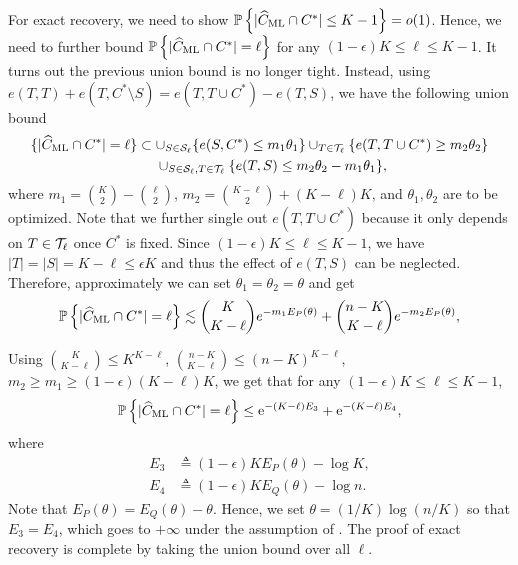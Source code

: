 For exact recovery, we need to show $ \mathbb{P}\left\{  | \widehat{C}_{\rm ML}  \cap C^* | \le K-1 \right\}  =o(1)$.
Hence, we need to further bound $\mathbb{P}\left\{  | \widehat{C}_{\rm ML}  \cap C^* | =\ell \right\} $ for any $(1-\epsilon)K \le \ell \le K-1$. 
It turns out the previous union bound  is no longer tight. Instead, using
$ e(T, T) + e(T, C^*\setminus S) = e(T, T\cup C^*) - e(T, S)$, we have the following union bound
\begin{align*}
 \{   | \widehat{C}_{\rm ML}  \cap C^* | = \ell \}   
 & \subset \cup_{S \in {\mathcal{S}}_\ell} \{ e(S, C^*)  \leq m_1 \theta_1  \}  \cup_{T \in {\mathcal{T}}_\ell} \{ e(T, T\cup C^*) \ge m_2\theta_2 \}  \\
 & ~~~~ \cup_{S \in {\mathcal{S}}_\ell, T \in {\mathcal{T}}_\ell} \{ e(T, S) \le m_2 \theta_2 - m_1 \theta_1 \},
\end{align*}
where $m_1 = \binom{K}{2} - \binom{\ell}{2}$, $m_2= \binom{K-\ell}{2} + (K-\ell) K$, and $\theta_1,\theta_2$ are to be optimized.
Note that we further single out $e(T, T\cup C^*)$ because it only depends on $T \in {\mathcal{T}}_\ell$ once $C^*$ is fixed. 
Since $(1-\epsilon)K \le \ell \le K-1$, we have $|T| = |S| = K-\ell \le \epsilon K$ and thus the effect of $e(T, S)$ can be neglected.
 Therefore, approximately we can set $\theta_1=\theta_2=\theta$ and get
\begin{align}
\mathbb{P}\left\{  | \widehat{C}_{\rm ML}  \cap C^* | =\ell \right\} \lesssim  \binom{K}{K-\ell} e^{- m_1 E_P(\theta)}  + 
 \binom{n-K}{K-\ell} e^{- m_2 E_P(\theta) },
\end{align}

Using $\binom{K}{K-\ell} \le K^{K-\ell}$, $\binom{n-K}{K-\ell} \le (n-K)^{K-\ell}$, $m_2 \ge m_1 \ge (1-\epsilon) (K-\ell) K$, 
we get that for any $(1-\epsilon)K \le \ell \le K-1$,
\begin{align}
\mathbb{P}\left\{  | \widehat{C}_{\rm ML}  \cap C^* |=\ell \right\}  \le {\rm e}^{-(K-\ell) E_3} + {\rm e}^{-(K-\ell) E_4}, \label{eq:weakProbupperbound1}
\end{align}
where
\begin{align*}
E_3 &\triangleq (1-\epsilon) K E_P(\theta)  - \log K , \\
E_4 &\triangleq (1-\epsilon) K E_Q(\theta) - \log n. 
\end{align*}
Note that $E_P(\theta)= E_Q(\theta) - \theta$.  Hence, we set
$\theta= (1/K) \log (n/K)$ so that $E_3=E_4$, which goes to $+\infty$ under the assumption of .
The proof of exact recovery is complete by taking the union bound over all $\ell$.






